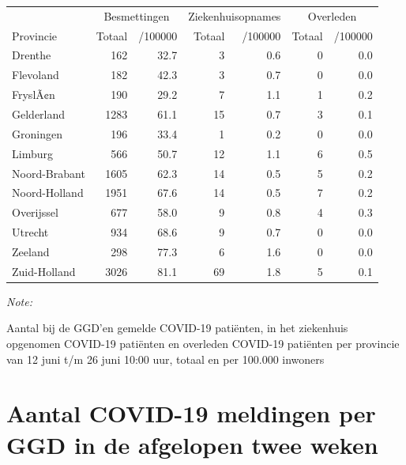 \documentclass[
  english,
  man,floatsintext]{apa6}
\begin{document}
\begin{table}
\centering
\begin{threeparttable}
\begin{tabular}{lrrrrrr}
\toprule
\multicolumn{1}{c}{ } & \multicolumn{2}{c}{Besmettingen} & \multicolumn{2}{c}{Ziekenhuisopnames} & \multicolumn{2}{c}{Overleden} \\
\cmidrule(l{3pt}r{3pt}){2-3} \cmidrule(l{3pt}r{3pt}){4-5} \cmidrule(l{3pt}r{3pt}){6-7}
Provincie & Totaal & /100000 & Totaal & /100000 & Totaal & /100000\\
\midrule
Drenthe & 162 & 32.7 & 3 & 0.6 & 0 & 0.0\\
Flevoland & 182 & 42.3 & 3 & 0.7 & 0 & 0.0\\
FryslÃ¢n & 190 & 29.2 & 7 & 1.1 & 1 & 0.2\\
Gelderland & 1283 & 61.1 & 15 & 0.7 & 3 & 0.1\\
Groningen & 196 & 33.4 & 1 & 0.2 & 0 & 0.0\\
Limburg & 566 & 50.7 & 12 & 1.1 & 6 & 0.5\\
Noord-Brabant & 1605 & 62.3 & 14 & 0.5 & 5 & 0.2\\
Noord-Holland & 1951 & 67.6 & 14 & 0.5 & 7 & 0.2\\
Overijssel & 677 & 58.0 & 9 & 0.8 & 4 & 0.3\\
Utrecht & 934 & 68.6 & 9 & 0.7 & 0 & 0.0\\
Zeeland & 298 & 77.3 & 6 & 1.6 & 0 & 0.0\\
Zuid-Holland & 3026 & 81.1 & 69 & 1.8 & 5 & 0.1\\
\bottomrule
\end{tabular}
\begin{tablenotes}
\item \textit{Note: } 
\item Aantal bij de GGD’en gemelde COVID-19 patiënten, in het ziekenhuis opgenomen COVID-19 patiënten en overleden COVID-19 patiënten per provincie van 12 juni t/m 26 juni 10:00 uur, totaal en per 100.000 inwoners
\end{tablenotes}
\end{threeparttable}
\end{table}

\newpage

\hypertarget{aantal-covid-19-meldingen-per-ggd-in-de-afgelopen-twee-weken}{%
\section{Aantal COVID-19 meldingen per GGD in de afgelopen twee weken}\label{aantal-covid-19-meldingen-per-ggd-in-de-afgelopen-twee-weken}}
\end{document}
